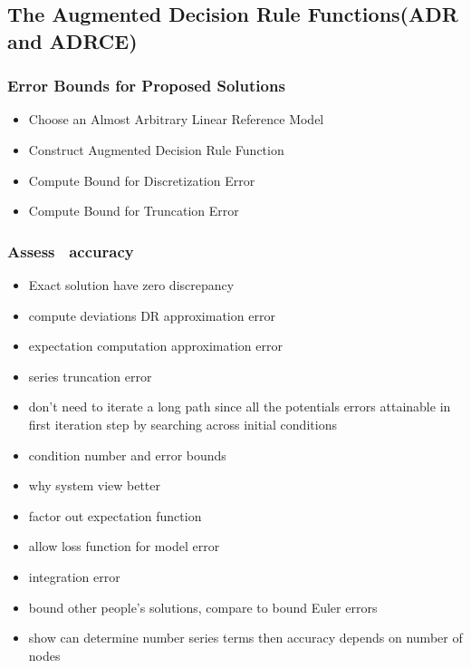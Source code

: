 \documentclass[tikz]{beamer}
\begin{document}
\subsection{The Augmented Decision Rule Functions(ADR and ADRCE)}


  \begin{frame}
\frametitle{Error Bounds for Proposed Solutions}
    
\begin{itemize}
\item Choose an Almost  Arbitrary Linear Reference Model
\item Construct Augmented Decision Rule Function
\item Compute Bound for Discretization Error
\item Compute Bound for Truncation Error
\end{itemize}

  \end{frame}




\begin{frame}
  \frametitle{Assess \ADR\  accuracy}
  \begin{itemize}
  \item Exact solution have zero discrepancy
  \item compute deviations  DR approximation error
  \item expectation computation approximation error
  \item series truncation error
  \item don't need to iterate a long path since all the potentials 
errors attainable in first iteration step by searching across initial conditions
  \end{itemize}


\end{frame}

\begin{frame}
  \begin{itemize}
\item condition number and error bounds
  \item why system view better
  \item factor out expectation function
  \item allow loss function for model error
  \item integration error 
  \item bound other people's solutions, compare to bound Euler errors
  \item show can determine number series terms then accuracy depends on number of nodes
  \end{itemize}
\end{frame}
\end{document}
